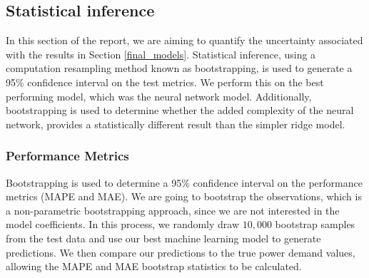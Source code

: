 \documentclass[11pt]{article}
\begin{document}

\subsection{Statistical inference}

In this section of the report, we are aiming to quantify the uncertainty associated with the results in Section \ref{final_models}. Statistical inference, using a computation resampling method known as bootstrapping, is used to generate a 95\% confidence interval on the test metrics. We perform this on the best performing model, which was the neural network model. Additionally, bootstrapping is used to determine whether the added complexity of the neural network, provides a statistically different result than the simpler ridge model.



\subsubsection{Performance Metrics}


Bootstrapping is used to determine a 95\% confidence interval on the performance metrics (MAPE and MAE). We are going to bootstrap the observations, which is a non-parametric bootstrapping approach, since we are not interested in the model coefficients. In this process, we randomly draw $10,000$ bootstrap samples from the test data and use our best machine learning model to generate predictions. We then compare our predictions to the true power demand values, allowing the MAPE and MAE bootstrap statistics to be calculated. 
\\
\end{document}
